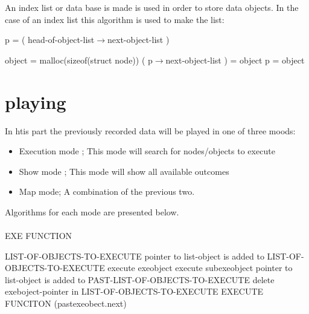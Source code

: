 \documentclass[15pt,a4paper,oneside]{article}
\begin{document}
An index list or data base is made is used in order to store data objects. In the case of an index list this algorithm is used to make the list:
\begin{algorithm}[H]\begin{algorithmic}
\STATE p = ( head-of-object-list$\rightarrow$next-object-list )
\end{algorithmic}\end{algorithm}
\begin{algorithm}[H]\begin{algorithmic}
\STATE object = malloc(sizeof(struct node))
\STATE ( p$\rightarrow$next-object-list ) = object
\STATE p = object
\ENDIF
\end{algorithmic}\end{algorithm}

\section{playing}
In htis part the previously recorded data will be played in one of three moods:
\begin{itemize}
\item Execution mode ; This mode will search for nodes/objects to execute
\item Show mode ; This mode will show all available outcomes
\item Map mode; A combination of the previous two.
\end{itemize}
Algorithms for each mode are presented below.\\\\
EXE FUNCTION
\begin{algorithm}[H]\begin{algorithmic}
\STATE LIST-OF-OBJECTS-TO-EXECUTE
\STATE pointer to list-object is added to LIST-OF-OBJECTS-TO-EXECUTE 
\ENDIF
\ENDFOR
\ENDFOR
{}
\STATE execute exeobject
\STATE execute subexeobject
\ENDFOR
\STATE pointer to list-object is added to PAST-LIST-OF-OBJECTS-TO-EXECUTE 
\STATE delete exeboject-pointer in LIST-OF-OBJECTS-TO-EXECUTE 
\ENDIF
\ENDFOR
{}
\STATE EXECUTE FUNCITON (pastexeobect.next)
\ENDFOR
\end{algorithmic}\end{algorithm}
\end{document}
